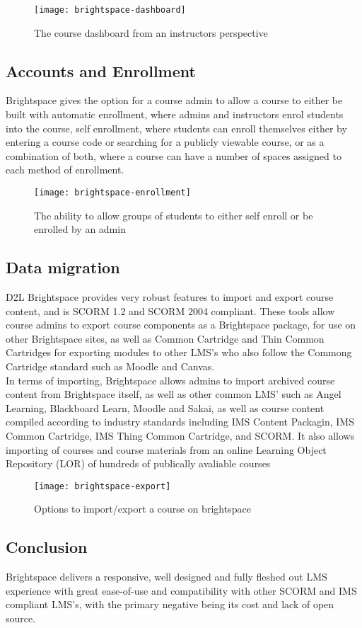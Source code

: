 \begin{figure}
\centering
\texttt{[image: brightspace-dashboard]}
\caption{The course dashboard from an instructors perspective}
\end{figure}

\subsection{Accounts and Enrollment}
Brightspace gives the option for a course admin to allow a course to either be built with automatic enrollment, where admins and instructors enrol students into the course, self enrollment, where students can enroll themselves either by entering a course code or searching for a publicly viewable course, or as a combination of both, where a course can have a number of spaces assigned to each method of enrollment.

\begin{figure}
\centering
\texttt{[image: brightspace-enrollment]}
\caption{The ability to allow groups of students to either self enroll or be enrolled by an admin}
\end{figure}

\subsection{Data migration}
D2L Brightspace provides very robust features to import and export course content, and is SCORM 1.2 and SCORM 2004 compliant. These tools allow course admins to export course components as a Brightspace package, for use on other Brightspace sites, as well as Common Cartridge and Thin Common Cartridges for exporting modules to other LMS's who also follow the Commong Cartridge standard such as Moodle and Canvas.\\
In terms of importing, Brightspace allows admins to import archived course content from Brightspace itself, as well as other common LMS' such as Angel Learning, Blackboard Learn, Moodle and Sakai, as well as course content compiled according to industry standards including IMS Content Packagin, IMS Common Cartridge, IMS Thing Common Cartridge, and SCORM. It also allows importing of courses and course materials from an online Learning Object Repository (LOR) of hundreds of publically avaliable courses\\

\begin{figure}
\centering
\texttt{[image: brightspace-export]}
\caption{Options to import/export a course on brightspace}
\end{figure}

\subsection{Conclusion}
Brightspace delivers a responsive, well designed and fully fleshed out LMS experience with great ease-of-use and compatibility with other SCORM and IMS compliant LMS's, with the primary negative being its cost and lack of open source.


